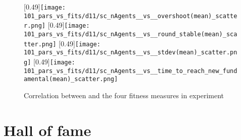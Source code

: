 \begin{figure}
	\centering
	[0.49\linewidth]{\texttt{[image: 101\_pars\_vs\_fits/d11/sc\_nAgents\_\_vs\_\_overshoot(mean)\_scatter.png]}}
	[0.49\linewidth]{\texttt{[image: 101\_pars\_vs\_fits/d11/sc\_nAgents\_\_vs\_\_round\_stable(mean)\_scatter.png]}}
	[0.49\linewidth]{\texttt{[image: 101\_pars\_vs\_fits/d11/sc\_nAgents\_\_vs\_\_stdev(mean)\_scatter.png]}}
	[0.49\linewidth]{\texttt{[image: 101\_pars\_vs\_fits/d11/sc\_nAgents\_\_vs\_\_time\_to\_reach\_new\_fundamental(mean)\_scatter.png]}}
	
	\caption{Correlation between \ssmmnAgents{} and the four fitness measures in experiment \deleven}
	\label{fig:d11_parvfit_scAgents}
\end{figure}


\section{Hall of fame}\label{section:hall_of_fame}

